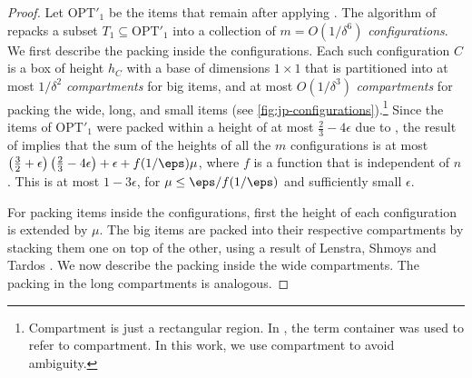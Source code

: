 \begin{proof}
Let $\text{OPT}'_1$ be the items that remain after applying . 
The algorithm of \cite{3d-strip-packing} repacks a subset $T_1 \subseteq \text{OPT}'_1$ into a collection of $m = O(1/\delta^6)$ {\em configurations}. We first describe the packing inside the configurations. Each such configuration $C$ is a box of height $h_C$ with a base of dimensions $1\times 1$ that is partitioned into at most $1/\delta^2$ {\em compartments} for big items, and at most $O(1/\delta^3)$ {\em compartments} for packing the wide, long, and small items (see \cref{fig:jp-configurations}).\footnote{Compartment is just a rectangular region.
In \cite{3d-strip-packing}, the term container was used to refer to compartment. In this work, we use compartment to avoid ambiguity.} 
Since the items of $\text{OPT}'_1$ were packed within a height of at most $\frac{2}{3}-4\epsilon$ due to , the result of \cite{3d-strip-packing} implies that the sum of the heights of all the $m$ configurations is at most $\left(\frac{3}{2}+\epsilon\right)\left(\frac{2}{3}-4\epsilon\right)+\epsilon+
f(1/\eps)\mu$, where $f$ is a function that is independent of $n$.  
This is at most $1-3\epsilon$, for $\mu \le \eps / f(1/\eps)$ and sufficiently small $\epsilon$. 

 


For packing items inside the configurations, first the height of each configuration is extended by $\mu$. The big items are packed into their respective compartments by stacking them one on top of the other, using a result of Lenstra, Shmoys and Tardos \cite{lenstra-scheduling}.
We now describe the packing inside the wide compartments. The packing in the long compartments is analogous.




\end{proof}
